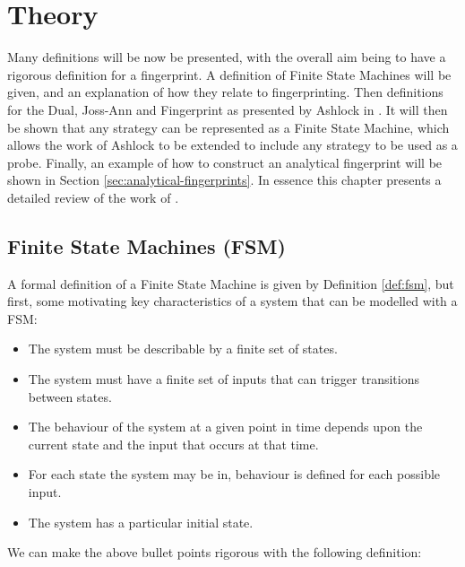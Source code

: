 
\chapter{Theory}\label{cha:theory}

Many definitions will be now be presented, with the overall aim being to have a rigorous definition for a fingerprint.
A definition of Finite State Machines will be given, and an explanation of how they relate to fingerprinting.
Then definitions for the Dual, Joss-Ann and Fingerprint as presented by Ashlock in \cite{Ashlock2004}.
It will then be shown that any strategy can be represented as a Finite State Machine, which allows the work of Ashlock to be extended to include any strategy to be used as a probe.
Finally, an example of how to construct an analytical fingerprint will be shown in Section \ref{sec:analytical-fingerprints}.
In essence this chapter presents a detailed review of the work of \cite{Ashlock2008, Ashlock2010, Ashlock2004,  Ashlock2005, Ashlock2009, Ashlock2006}.



\section{Finite State Machines (FSM)}\label{sec:fsm}

A formal definition of a Finite State Machine is given by Definition \ref{def:fsm}, but first, some motivating key characteristics of a system that can be modelled with a FSM:

\begin{itemize}
 \item The system must be describable by a finite set of states.
 \item The system must have a finite set of inputs that can trigger transitions between states.
 \item The behaviour of the system at a given point in time depends upon the current state and the input that occurs at that time.
 \item For each state the system may be in, behaviour is defined for each possible input.
 \item The system has a particular initial state.
\end{itemize}

We can make the above bullet points rigorous with the following definition:

